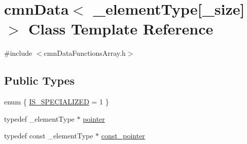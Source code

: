 \hypertarget{classcmn_data_3_01__element_type[__size]_4}{}\section{cmn\+Data$<$ \+\_\+element\+Type\mbox{[}\+\_\+size\mbox{]}$>$ Class Template Reference}
\label{classcmn_data_3_01__element_type[__size]_4}


{\ttfamily \#include $<$cmn\+Data\+Functions\+Array.\+h$>$}

\subsection*{Public Types}
\begin{DoxyCompactItemize}
\item 
enum \{ \hyperlink{classcmn_data_3_01__element_type[__size]_4_a9d637558f427f9c59075d571e6f9ac5fa11da30d776c8987ce057d7265b627227}{I\+S\+\_\+\+S\+P\+E\+C\+I\+A\+L\+I\+Z\+E\+D} = 1
 \}
\item 
typedef \+\_\+element\+Type $\ast$ \hyperlink{classcmn_data_3_01__element_type[__size]_4_ad12f77b67872d7ed06978b393bc3d29e}{pointer}
\item 
typedef const \+\_\+element\+Type $\ast$ \hyperlink{classcmn_data_3_01__element_type[__size]_4_aaf9e2a181a2500f07b6c99b2bf42477f}{const\+\_\+pointer}
\end{DoxyCompactItemize}
